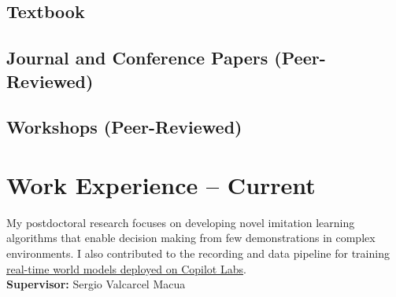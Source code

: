 \documentclass[a4paper,12pt]{article}
\begin{document}
\subsection{Textbook}
\printbibliography[heading=none, type=book, notkeyword=skip]


\subsection{Journal and Conference Papers (Peer-Reviewed)}
\printbibliography[heading=none, filter=conf_jour, notkeyword=skip]%

\subsection{Workshops (Peer-Reviewed)}
\printbibliography[heading=none, keyword=workshop, notkeyword=skip]%


\expspace




\section{Work Experience -- Current}

\begin{expblock}
    My postdoctoral research focuses on developing novel imitation learning algorithms that enable decision making from few demonstrations in complex environments. I also contributed to the recording and data pipeline for training \href{https://copilot.microsoft.com/labs/experiments/copilot-gaming-experiences}{real-time world models deployed on Copilot Labs}.\\
    \textbf{Supervisor:} Sergio Valcarcel Macua
\end{expblock}
\end{document}
